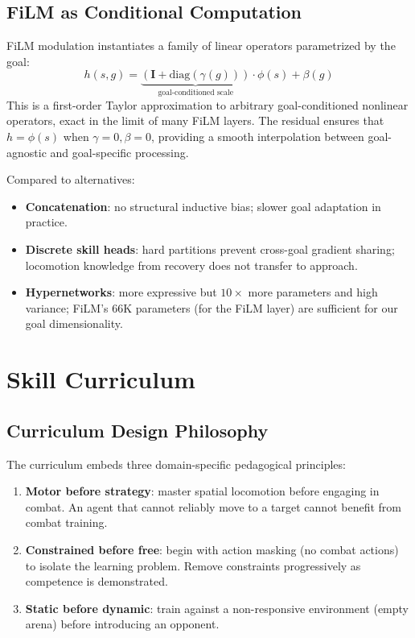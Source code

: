 \documentclass[11pt,a4paper]{article}
\begin{document}
\subsection{FiLM as Conditional Computation}

FiLM modulation instantiates a family of linear operators parametrized by the goal:
\begin{equation}
h(s, g) = \underbrace{(\mathbf{I} + \text{diag}(\gamma(g)))}_{\text{goal-conditioned scale}} \cdot \phi(s) + \beta(g)
\end{equation}
This is a first-order Taylor approximation to arbitrary goal-conditioned nonlinear operators, exact in the limit of many FiLM layers.
The residual ensures that $h = \phi(s)$ when $\gamma = 0, \beta = 0$, providing a smooth interpolation between goal-agnostic and goal-specific processing.

Compared to alternatives:
\begin{itemize}[leftmargin=1.5em]
    \item \textbf{Concatenation}: no structural inductive bias; slower goal adaptation in practice.
    \item \textbf{Discrete skill heads}: hard partitions prevent cross-goal gradient sharing; locomotion knowledge from recovery does not transfer to approach.
    \item \textbf{Hypernetworks}: more expressive but $10\times$ more parameters and high variance; FiLM's $66$K parameters (for the FiLM layer) are sufficient for our goal dimensionality.
\end{itemize}

\section{Skill Curriculum}
\label{sec:curriculum}

\subsection{Curriculum Design Philosophy}

The curriculum embeds three domain-specific pedagogical principles:

\begin{enumerate}[leftmargin=1.5em]
    \item \textbf{Motor before strategy}: master spatial locomotion before engaging in combat. An agent that cannot reliably move to a target cannot benefit from combat training.
    \item \textbf{Constrained before free}: begin with action masking (no combat actions) to isolate the learning problem. Remove constraints progressively as competence is demonstrated.
    \item \textbf{Static before dynamic}: train against a non-responsive environment (empty arena) before introducing an opponent.
\end{enumerate}
\end{document}
